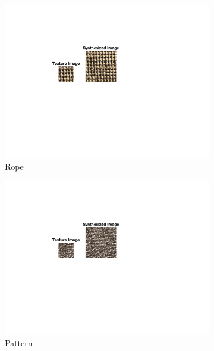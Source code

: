 \documentclass[10pt,twocolumn,letterpaper]{article}
\begin{document}
\begin{figure}
\begin{subfigure}[h]{0.33\textwidth}
    \includegraphics[trim={4.5cm 7cm 8.0cm 3cm}, clip, scale=1.5, width=\textwidth]{../results/syn_final/result_rope_B_60.png}
    \caption{Rope}
    \label{fig:apple_res}
\end{subfigure}
\hfill
\begin{subfigure}[h]{0.33\textwidth}
   \centering
   \includegraphics[trim={4.5cm 7cm 8.0cm 3cm}, clip, scale=1.5, width=\textwidth]{../results/syn_final/result_br_pattern_B_60.png}
   \caption{Pattern}
   \label{fig:apple_res}
\end{subfigure}
\hfill
\begin{subfigure}[h]{0.33\textwidth}
   \centering

\end{subfigure}
\end{figure}
\end{document}
